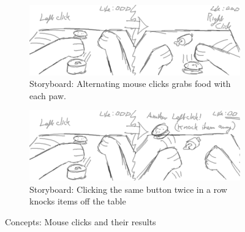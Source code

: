 \documentclass{article}
\begin{document}
\begin{figure}[H]
        \centering
        \begin{subfigure}[b]{0.8\textwidth}
                \includegraphics[width=\textwidth]{img/storyboard/original_2.png}
                \caption{Storyboard: Alternating mouse clicks grabs food with each paw.}
                \label{fig:original2}
        \end{subfigure}

%
        \begin{subfigure}[b]{0.8\textwidth}
                \includegraphics[width=\textwidth]{img/storyboard/original_3.png}
                \caption{Storyboard: Clicking the same button twice in a row knocks items off the table}
                \label{fig:original3}
        \end{subfigure}
        \caption{Concepts: Mouse clicks and their results}\label{fig:concepts2}
\end{figure}
\end{document}

